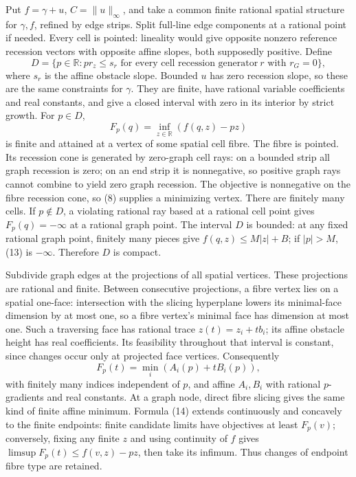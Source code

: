 \documentclass[
  11pt,
]{article}
\begin{document}
Put \(f=\gamma+u\), \(C=\|u\|_\infty\), and take a common finite
rational spatial structure for \(\gamma,f\), refined by edge strips.
Split full-line edge components at a rational point if needed. Every
cell is pointed: lineality would give opposite nonzero reference
recession vectors with opposite affine slopes, both supposedly positive.
Define \[
 D=\{p\in\mathbb{R}:p r_z\leq s_r\text{ for every cell recession generator}
                                      \ r\text{ with }r_G=0\},           \tag{12}
\] where \(s_r\) is the affine obstacle slope. Bounded \(u\) has zero
recession slope, so these are the same constraints for \(\gamma\). They
are finite, have rational variable coefficients and real constants, and
give a closed interval with zero in its interior by strict growth. For
\(p\in D\), \[
                         F_p(q)=\inf_{z\in\mathbb{R}}(f(q,z)-pz)          \tag{13}
\] is finite and attained at a vertex of some spatial cell fibre. The
fibre is pointed. Its recession cone is generated by zero-graph cell
rays: on a bounded strip all graph recession is zero; on an end strip it
is nonnegative, so positive graph rays cannot combine to yield zero
graph recession. The objective is nonnegative on the fibre recession
cone, so (8) supplies a minimizing vertex. There are finitely many
cells. If \(p\notin D\), a violating rational ray based at a rational
cell point gives \(F_p(q)=-\infty\) at a rational graph point. The
interval \(D\) is bounded: at any fixed rational graph point, finitely
many pieces give \(f(q,z)\leq M|z|+B\); if \(|p|>M\), (13) is
\(-\infty\). Therefore \(D\) is compact.

Subdivide graph edges at the projections of all spatial vertices. These
projections are rational and finite. Between consecutive projections, a
fibre vertex lies on a spatial one-face: intersection with the slicing
hyperplane lowers its minimal-face dimension by at most one, so a fibre
vertex's minimal face has dimension at most one. Such a traversing face
has rational trace \(z(t)=z_i+t b_i\); its affine obstacle height has
real coefficients. Its feasibility throughout that interval is constant,
since changes occur only at projected face vertices. Consequently \[
 F_p(t)=\min_i(A_i(p)+tB_i(p)),                              \tag{14}
\] with finitely many indices independent of \(p\), and affine
\(A_i,B_i\) with rational \(p\)-gradients and real constants. At a graph
node, direct fibre slicing gives the same kind of finite affine minimum.
Formula (14) extends continuously and concavely to the finite endpoints:
finite candidate limits have objectives at least \(F_p(v)\); conversely,
fixing any finite \(z\) and using continuity of \(f\) gives
\(\limsup F_p(t)\leq f(v,z)-pz\), then take its infimum. Thus changes of
endpoint fibre type are retained.
\end{document}
